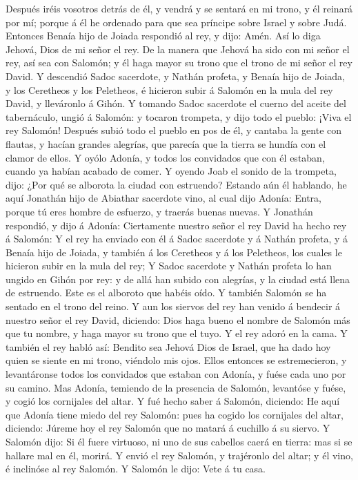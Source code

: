 Después iréis vosotros detrás de él, y vendrá y se sentará en mi trono,
y él reinará por mí; porque á él he ordenado para que sea príncipe sobre
Israel y sobre Judá.  Entonces Benaía hijo de Joiada
respondió al rey, y dijo: Amén. Así lo diga Jehová, Dios de mi señor el
rey.  De la manera que Jehová ha sido con mi señor el
rey, así sea con Salomón; y él haga mayor su trono que el trono de mi
señor el rey David.  Y descendió Sadoc sacerdote, y
Nathán profeta, y Benaía hijo de Joiada, y los Ceretheos y los
Peletheos, é hicieron subir á Salomón en la mula del rey David, y
lleváronlo á Gihón.  Y tomando Sadoc sacerdote el cuerno
del aceite del tabernáculo, ungió á Salomón: y tocaron trompeta, y dijo
todo el pueblo: ¡Viva el rey Salomón!  Después subió todo
el pueblo en pos de él, y cantaba la gente con flautas, y hacían grandes
alegrías, que parecía que la tierra se hundía con el clamor de ellos.
 Y oyólo Adonía, y todos los convidados que con él
estaban, cuando ya habían acabado de comer. Y oyendo Joab el sonido de
la trompeta, dijo: ¿Por qué se alborota la ciudad con estruendo?
 Estando aún él hablando, he aquí Jonathán hijo de
Abiathar sacerdote vino, al cual dijo Adonía: Entra, porque tú eres
hombre de esfuerzo, y traerás buenas nuevas.  Y Jonathán
respondió, y dijo á Adonía: Ciertamente nuestro señor el rey David ha
hecho rey á Salomón:  Y el rey ha enviado con él á Sadoc
sacerdote y á Nathán profeta, y á Benaía hijo de Joiada, y también á los
Ceretheos y á los Peletheos, los cuales le hicieron subir en la mula del
rey;  Y Sadoc sacerdote y Nathán profeta lo han ungido en
Gihón por rey: y de allá han subido con alegrías, y la ciudad está llena
de estruendo. Este es el alboroto que habéis oído.  Y
también Salomón se ha sentado en el trono del reino.  Y
aun los siervos del rey han venido á bendecir á nuestro señor el rey
David, diciendo: Dios haga bueno el nombre de Salomón más que tu nombre,
y haga mayor su trono que el tuyo. Y el rey adoró en la cama.
 Y también el rey habló así: Bendito sea Jehová Dios de
Israel, que ha dado hoy quien se siente en mi trono, viéndolo mis ojos.
 Ellos entonces se estremecieron, y levantáronse todos
los convidados que estaban con Adonía, y fuése cada uno por su camino.
 Mas Adonía, temiendo de la presencia de Salomón,
levantóse y fuése, y cogió los cornijales del altar.  Y
fué hecho saber á Salomón, diciendo: He aquí que Adonía tiene miedo del
rey Salomón: pues ha cogido los cornijales del altar, diciendo: Júreme
hoy el rey Salomón que no matará á cuchillo á su siervo. 
Y Salomón dijo: Si él fuere virtuoso, ni uno de sus cabellos caerá en
tierra: mas si se hallare mal en él, morirá.  Y envió el
rey Salomón, y trajéronlo del altar; y él vino, é inclinóse al rey
Salomón. Y Salomón le dijo: Vete á tu casa.

